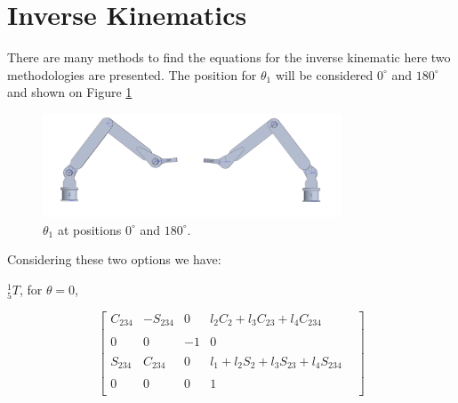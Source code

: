 \documentclass[transmag]{IEEEtran}
\begin{document}
\clearpage
\newpage





\section{Inverse Kinematics}

There are many methods to find the equations for the inverse kinematic here two methodologies are presented. The position for $\theta_1$ will be considered $0^{\circ}$ and $180^{\circ}$ and shown on Figure \ref{theta_1_0-180}

\begin{figure}[h]
\centerline{\includegraphics[width=3.5in]{./images/theta_1_0-180}}
\caption{$\theta_1$ at positions $0^{\circ}$ and $180^{\circ}$.\label{theta_1_0-180}}
\end{figure}

Considering these two options we have:

\begin{eqfloat}

$^1_5T$, for $\theta = 0$,

\begin{equation}
\begin{bmatrix}
C_{234}
& 
-S_{234}
& 
0
& 
l_2 C_2 + l_3 C_{23} + l_4 C_{234} \\
&&&&
\\
0    
& 
0
& 
-1
& 
0
\\
&&&&
\\
S_{234}
&
C_{234}
&
0
&
l_1 + l_2 S_2 + l_3 S_{23} + l_4 S_{234} 
\\
&&&&
\\
0           & 0            & 0      & 1   \\
\end{bmatrix}
\label{Inverse Kinematics - T0_5 - theta=0}
\end{equation}
\end{eqfloat}
\end{document}
